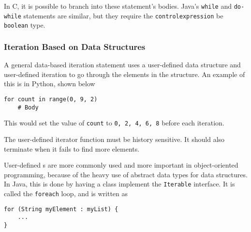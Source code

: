 In C, it is possible to branch into these statement's bodies.
Java's \texttt{while} and \texttt{do-while} statements are similar, but they require the \texttt{control\textunderscore{}expression} be \texttt{boolean} type.

\subsubsection{Iteration Based on Data Structures}\label{subsubsec:Iteration_Based_on_Data_Structures}
A general data-based iteration statement uses a user-defined data structure and user-defined iteration to go through the elements in the structure.
An example of this is in Python, shown below
\begin{verbatim}
for count in range(0, 9, 2)
    # Body
\end{verbatim}
This would set the value of \texttt{count} to \texttt{0, 2, 4, 6, 8} before each iteration.

The user-defined iterator function must be history sensitive.
It should also terminate when it fails to find more elements.

User-defined s are more commonly used and more important in object-oriented programming, because of the heavy use of abstract data types for data structures.
In Java, this is done by having a class implement the \texttt{Iterable} interface.
It is called the \texttt{foreach} loop, and is written as
\begin{verbatim}
for (String myElement : myList) {
    ...
}
\end{verbatim}

